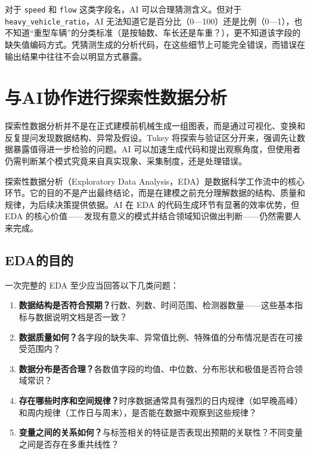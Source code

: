 对于 \texttt{speed} 和 \texttt{flow} 这类字段名，AI 可以合理猜测含义。但对于 \texttt{heavy\_vehicle\_ratio}，AI 无法知道它是百分比（0—100）还是比例（0—1），也不知道“重型车辆”的分类标准（是按轴数、车长还是车重？），更不知道该字段的缺失值编码方式。凭猜测生成的分析代码，在这些细节上可能完全错误，而错误在输出结果中往往不会以明显方式暴露。

\section{与AI协作进行探索性数据分析}

探索性数据分析并不是在正式建模前机械生成一组图表，而是通过可视化、变换和反复提问发现数据结构、异常及假设。Tukey 将探索与验证区分开来，强调先让数据暴露值得进一步检验的问题\cite{tukey1977exploratory}。AI 可以加速生成代码和提出观察角度，但使用者仍需判断某个模式究竟来自真实现象、采集制度，还是处理错误。
\label{sec:eda}

探索性数据分析（Exploratory Data Analysis，EDA）是数据科学工作流中的核心环节。它的目的不是产出最终结论，而是在建模之前充分理解数据的结构、质量和规律，为后续决策提供依据。AI 在 EDA 的代码生成环节有显著的效率优势，但 EDA 的核心价值——发现有意义的模式并结合领域知识做出判断——仍然需要人来完成。

\subsection{EDA的目的}

一次完整的 EDA 至少应当回答以下几类问题：

\begin{enumerate}
  \item \textbf{数据结构是否符合预期？}行数、列数、时间范围、检测器数量——这些基本指标与数据说明文档是否一致？
  \item \textbf{数据质量如何？}各字段的缺失率、异常值比例、特殊值的分布情况是否在可接受范围内？
  \item \textbf{数据分布是否合理？}各数值字段的均值、中位数、分布形状和极值是否符合领域常识？
  \item \textbf{存在哪些时序和空间规律？}时序数据通常具有强烈的日内规律（如早晚高峰）和周内规律（工作日与周末），是否能在数据中观察到这些规律？
  \item \textbf{变量之间的关系如何？}与标签相关的特征是否表现出预期的关联性？不同变量之间是否存在多重共线性？
\end{enumerate}


